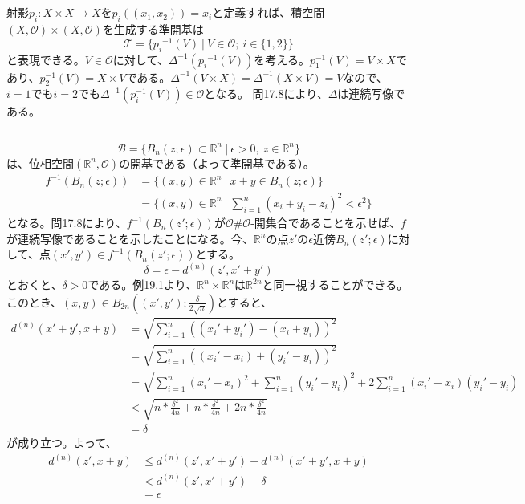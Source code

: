 \documentclass{jsarticle}
\begin{document}
\subsection{}
射影$p_i:X\times X\to X$を$p_i((x_1,x_2))=x_i$と定義すれば、積空間$(X,\mathcal{O})\times(X,\mathcal{O})$を生成する準開基は
\[\mathcal{T}=\{{p_i}^{-1}(V)\ |\ V\in\mathcal{O};\ i\in\{1,2\}\}\]
と表現できる。$V\in\mathcal{O}$に対して、$\Delta^{-1}({p_i}^{-1}(V))$を考える。$p_1^{-1}(V)=V\times X$であり、$p_2^{-1}(V)=X\times V$である。${\Delta}^{-1}(V\times X)={\Delta}^{-1}(X\times V)=V$なので、$i=1$でも$i=2$でも${\Delta}^{-1}(p_i^{-1}(V))\in\mathcal{O}$となる。
問17.8により、$\Delta$は連続写像である。



\subsection{}
\[\mathcal{B}=\{B_n(z;\epsilon)\subset\mathbb{R}^n\ |\ \epsilon>0,\ z\in\mathbb{R}^n\}\]
は、位相空間$(\mathbb{R}^n,\mathcal{O})$の開基である（よって準開基である）。
\begin{align*}
f^{-1}(B_n(z;\epsilon))&=\{(x,y)\in\mathbb{R}^n\ |\ x+y\in B_n(z;\epsilon)\}\\
&=\{(x,y)\in\mathbb{R}^n\ |\ \sum_{i=1}^n (x_i+y_i-z_i)^2<\epsilon^2\}
\end{align*}
となる。問17.8により、$f^{-1}(B_n(z';\epsilon))$が$\mathcal{O}\#\mathcal{O}$-開集合であることを示せば、$f$が連続写像であることを示したことになる。今、$\mathbb{R}^n$の点$z'$の$\epsilon$近傍$B_n(z';\epsilon)$に対して、点$(x',y')\in f^{-1}(B_n(z';\epsilon))$とする。
\[\delta=\epsilon-d^{(n)}(z',x'+y')\]
とおくと、$\delta>0$である。例19.1より、$\mathbb{R}^n\times\mathbb{R}^n$は$\mathbb{R}^{2n}$と同一視することができる。このとき、$(x,y)\in B_{2n}((x',y');\frac{\delta}{2\sqrt{n}})$とすると、
\begin{align*}
d^{(n)}(x'+y',x+y)&=\sqrt{\sum_{i=1}^{n}((x_i'+y_i')-(x_i+y_i))^2}\\
&=\sqrt{\sum_{i=1}^{n}((x_i'-x_i)+(y_i'-y_i))^2}\\
&=\sqrt{\sum_{i=1}^{n}(x_i'-x_i)^2+\sum_{i=1}^{n}(y_i'-y_i)^2+2\sum_{i=1}^{n}(x_i'-x_i)(y_i'-y_i)}\\
&<\sqrt{n*\frac{\delta^2}{4n}+n*\frac{\delta^2}{4n}+2n*\frac{\delta^2}{4n}}\\
&= \delta
\end{align*}
が成り立つ。よって、
\begin{align*}
d^{(n)}(z',x+y)&\leq d^{(n)}(z',x'+y')+d^{(n)}(x'+y',x+y)\\
&<d^{(n)}(z',x'+y')+\delta\\
&=\epsilon
\end{align*}
\end{document}
